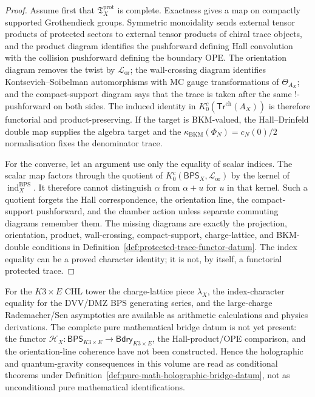 \begin{proof}
Assume first that
\(\mathfrak T_X^{\mathrm{prot}}\) is complete. Exactness gives a map on
compactly supported Grothendieck groups. Symmetric monoidality sends
external tensor products of protected sectors to external tensor
products of chiral trace objects, and the product diagram identifies the
pushforward defining Hall convolution with the collision pushforward
defining the boundary OPE. The orientation diagram removes the twist by
\(\mathcal L_{\mathrm{or}}\); the wall-crossing diagram identifies
Kontsevich--Soibelman automorphisms with MC gauge transformations of
\(\Theta_{A_X}\); and the compact-support diagram says that the trace is
taken after the same \( ! \)-pushforward on both sides. The induced
identity in \(K_0^c(\mathsf{Tr}^{\mathrm{ch}}(A_X))\) is therefore
functorial and product-preserving. If the target is BKM-valued, the
Hall--Drinfeld double map supplies the algebra target and the
	\(\kappa_{\mathrm{BKM}}(\Phi_N)=c_N(0)/2\) normalisation fixes the denominator
trace.

For the converse, let an argument use only the equality of scalar
indices. The scalar map factors through the quotient of
\(K_0^c(\mathsf{BPS}_X,\mathcal L_{\mathrm{or}})\) by the kernel of
\(\operatorname{ind}^{\mathrm{BPS}}_X\). It therefore cannot distinguish
\(\alpha\) from \(\alpha+u\) for \(u\) in that kernel. Such a quotient
forgets the Hall correspondence, the orientation line, the
compact-support pushforward, and the chamber action unless separate
commuting diagrams remember them. The missing diagrams are exactly the
projection, orientation, product, wall-crossing, compact-support,
charge-lattice, and BKM-double conditions in
Definition~\ref{def:protected-trace-functor-datum}. The index
equality can be a proved character identity; it is not, by itself, a
functorial protected trace.
\end{proof}

\begin{remark}
\label{rem:k3e-chl-holographic-bridge-obstruction}
For the $K3\times E$ CHL tower the charge-lattice piece
$\lambda_X$, the index-character equality for the DVV/DMZ BPS
generating series, and the large-charge Rademacher/Sen asymptotics are
available as arithmetic calculations and physics derivations. The complete pure
mathematical bridge datum is not yet present: the functor
$\mathcal H_X\colon\mathsf{BPS}_{K3\times E}\to\mathsf{Bdry}_{K3\times E}$,
the Hall-product/OPE comparison, and the orientation-line coherence have
not been constructed. Hence the holographic and quantum-gravity
consequences in this volume are read as conditional theorems under
Definition~\ref{def:pure-math-holographic-bridge-datum}, not as
unconditional pure mathematical identifications.
\end{remark}


